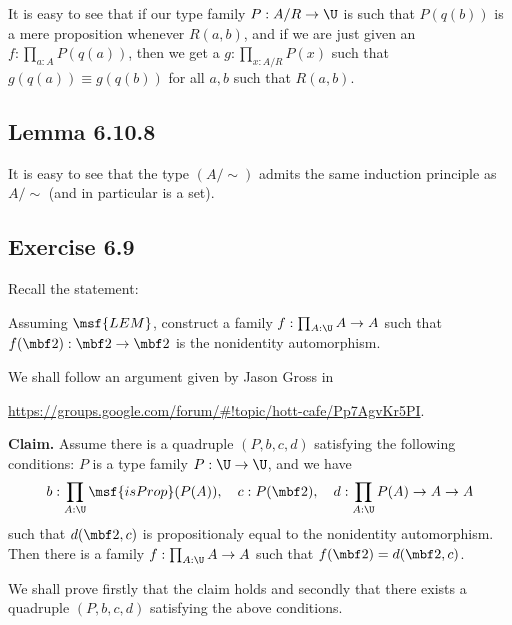 \documentclass[12pt]{article}
\begin{document}
It is easy to see that if our type family $P:A/R\to\U$ is such that $P(q(b))$ is a mere proposition whenever $R(a,b)$, and if we are just given an $f:\prod_{a:A}P(q(a))$, then we get a $g:\prod_{x:A/R}P(x)$ such that $g(q(a))\equiv g(q(b))$ for all $a,b$ such that $R(a,b)$.


\subsection{Lemma 6.10.8}


It is easy to see that the type $(A/\sim)$ admits the same induction principle as $A/\sim$ (and in particular is a set).


\subsection{Exercise 6.9}

Recall the statement:

Assuming $\msf{LEM}$, construct a family $f:\prod_{A:\U}A\to A$ such that $f(\mbf2):\mbf2\to\mbf2$ is the nonidentity automorphism.


We shall follow an argument given by Jason Gross in 

\nn\href{https://groups.google.com/forum/#!topic/hott-cafe/Pp7AgvKr5PI}{https://groups.google.com/forum/\#!topic/hott-cafe/Pp7AgvKr5PI}.


\nn\textbf{Claim.} Assume there is a quadruple $(P,b,c,d)$ satisfying the following conditions: $P$ is a type family $P:\U\to\U$, and we have
$$
b:\prod_{A:\U}\msf{isProp}(P(A)),\quad c:P(\mbf2),\quad d:\prod_{A:\U}P(A)\to A\to A
$$ 
such that $d(\mbf2,c)$ is propositionaly equal to the nonidentity automorphism. Then there is a family $f:\prod_{A:\U}A\to A$ such that $f(\mbf2)=d(\mbf2,c)$. %

We shall prove firstly that the claim holds and secondly that there exists a quadruple $(P,b,c,d)$ satisfying the above conditions.
\end{document}
